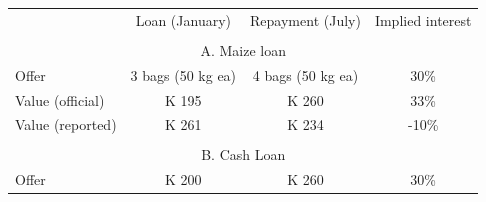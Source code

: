 \begin{tabular}{l ccc}
\hline
 & Loan (January) & Repayment (July) & Implied interest \\ 
\\
\multicolumn{4}{c}{A. Maize loan} \\ 
Offer & 3 bags (50 kg ea) & 4 bags (50 kg ea) & 30\% \\ 
Value (official) & K 195 & K 260 & 33\% \\ 
Value (reported) & K 261 & K 234 & -10\% \\ 
\\
\multicolumn{4}{c}{B. Cash Loan} \\
Offer& K 200 & K 260 & 30\% \\
\hline
\end{tabular}
